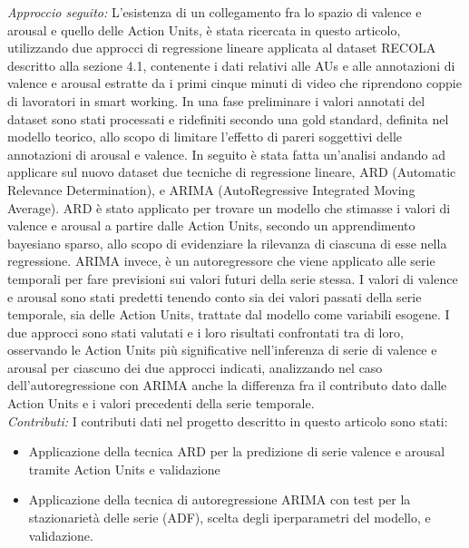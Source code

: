 \documentclass[10pt,journal,compsoc]{IEEEtran}
\begin{document}
\emph{Approccio seguito:}
L'esistenza di un collegamento fra lo spazio di valence e arousal e quello delle Action Units, è stata ricercata in questo articolo, utilizzando due approcci di regressione lineare applicata al dataset RECOLA descritto alla sezione 4.1, contenente i dati relativi alle AUs e alle annotazioni di valence e arousal estratte da i primi cinque minuti di video che riprendono coppie di lavoratori in smart working. In una fase preliminare i valori annotati del dataset sono stati processati e ridefiniti secondo una gold standard, definita nel modello teorico, allo scopo di limitare l'effetto di pareri soggettivi delle annotazioni di arousal e valence. In seguito è stata fatta un'analisi andando ad applicare sul nuovo dataset due tecniche di regressione lineare, ARD (Automatic Relevance Determination), e ARIMA (AutoRegressive Integrated Moving Average). ARD è stato applicato per trovare un modello che  stimasse i valori di valence e arousal a partire dalle Action Units, secondo un apprendimento bayesiano sparso, allo scopo di evidenziare la rilevanza di ciascuna di esse  nella regressione. ARIMA invece, è un autoregressore che viene applicato alle serie temporali per fare previsioni sui valori futuri della serie stessa. I valori di valence e arousal sono stati predetti tenendo conto sia dei valori passati della serie temporale, sia delle Action Units, trattate dal modello come variabili esogene. I due approcci sono stati valutati e i loro risultati confrontati tra di loro, osservando le Action Units più significative nell'inferenza di serie di valence e arousal per ciascuno dei due approcci indicati, analizzando nel caso dell'autoregressione con ARIMA anche la differenza fra il contributo dato dalle Action Units e i valori precedenti della serie temporale.\\
\emph{Contributi:}
I contributi dati nel progetto descritto in questo articolo sono stati:
\begin{itemize}
\item Applicazione della tecnica ARD per la predizione di serie valence e arousal tramite Action Units e validazione
\item Applicazione della tecnica di autoregressione ARIMA con test per la stazionarietà delle serie (ADF), scelta degli iperparametri del modello, e validazione.
\end{itemize}
\end{document}
